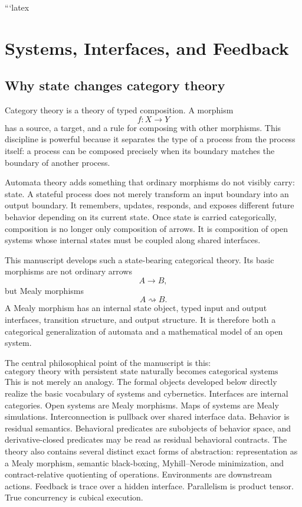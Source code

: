 ```latex
\chapter{Systems, Interfaces, and Feedback}
\label{chap:systems-interfaces-feedback}

\section{Why state changes category theory}
\label{sec:why-state-changes-category-theory}

Category theory is a theory of typed composition.  A morphism
\[
  f:X\to Y
\]
has a source, a target, and a rule for composing with other morphisms.  This
discipline is powerful because it separates the type of a process from the
process itself: a process can be composed precisely when its boundary matches
the boundary of another process.

Automata theory adds something that ordinary morphisms do not visibly carry:
state.  A stateful process does not merely transform an input boundary into an
output boundary.  It remembers, updates, responds, and exposes different
future behavior depending on its current state.  Once state is carried
categorically, composition is no longer only composition of arrows.  It is
composition of open systems whose internal states must be coupled along shared
interfaces.

This manuscript develops such a state-bearing categorical theory.  Its basic
morphisms are not ordinary arrows
\[
  A\to B,
\]
but Mealy morphisms
\[
  A\rightsquigarrow B.
\]
A Mealy morphism has an internal state object, typed input and output
interfaces, transition structure, and output structure.  It is therefore both
a categorical generalization of automata and a mathematical model of an open
system.

The central philosophical point of the manuscript is this:
\[
  \boxed{
  \text{category theory with persistent state naturally becomes
  categorical systems theory.}
  }
\]
This is not merely an analogy.  The formal objects developed below directly
realize the basic vocabulary of systems and cybernetics.  Interfaces are
internal categories.  Open systems are Mealy morphisms.  Maps of systems are
Mealy simulations.  Interconnection is pullback over shared interface data.
Behavior is residual semantics.  Behavioral predicates are subobjects of
behavior space, and derivative-closed predicates may be read as residual
behavioral contracts.  The theory also contains several distinct exact forms
of abstraction: representation as a Mealy morphism, semantic black-boxing,
Myhill--Nerode minimization, and contract-relative quotienting of operations.
Environments are downstream actions.  Feedback is trace over a hidden
interface.  Parallelism is product tensor.  True concurrency is cubical
execution.


